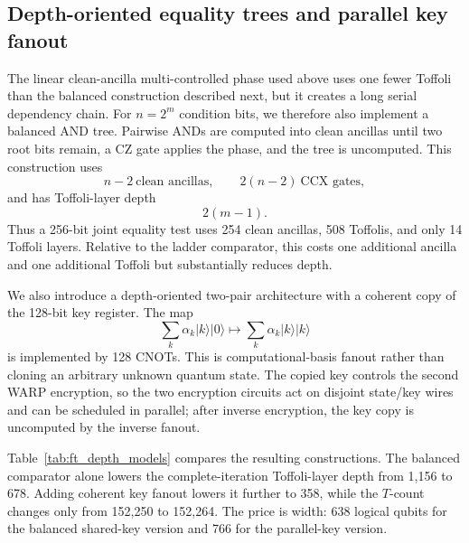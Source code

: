 \documentclass[10pt,a4paper]{article}
\providecommand{\ket}[1]{\lvert #1\rangle}
\begin{document}
\subsection{Depth-oriented equality trees and parallel key fanout}
\label{subsec:depth_oracle}
The linear clean-ancilla multi-controlled phase used above uses one fewer Toffoli than the balanced construction described next, but it creates a long serial dependency chain. For $n=2^m$ condition bits, we therefore also implement a balanced AND tree. Pairwise ANDs are computed into clean ancillas until two root bits remain, a CZ gate applies the phase, and the tree is uncomputed. This construction uses
\begin{equation}
    n-2\ \text{clean ancillas},\qquad 2(n-2)\ \text{CCX gates},
\end{equation}
and has Toffoli-layer depth
\begin{equation}
    2(m-1).
\end{equation}
Thus a 256-bit joint equality test uses 254 clean ancillas, 508 Toffolis, and only 14 Toffoli layers. Relative to the ladder comparator, this costs one additional ancilla and one additional Toffoli but substantially reduces depth.

We also introduce a depth-oriented two-pair architecture with a coherent copy of the 128-bit key register. The map
\begin{equation}
    \sum_k \alpha_k\ket{k}\ket{0}\longmapsto
    \sum_k \alpha_k\ket{k}\ket{k}
\end{equation}
is implemented by 128 CNOTs. This is computational-basis fanout rather than cloning an arbitrary unknown quantum state. The copied key controls the second WARP encryption, so the two encryption circuits act on disjoint state/key wires and can be scheduled in parallel; after inverse encryption, the key copy is uncomputed by the inverse fanout.

Table~\ref{tab:ft_depth_models} compares the resulting constructions. The balanced comparator alone lowers the complete-iteration Toffoli-layer depth from 1,156 to 678. Adding coherent key fanout lowers it further to 358, while the $T$-count changes only from 152,250 to 152,264. The price is width: 638 logical qubits for the balanced shared-key version and 766 for the parallel-key version.
\end{document}
